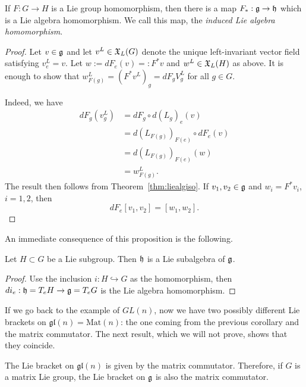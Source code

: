 \begin{proposition}
  If $F: G\to H$ is a Lie group homomorphism, then there is a map $F_*:\mathfrak{g}\to\mathfrak{h}$ which is a Lie algebra homomorphism. We call this map, the \emph{induced Lie algebra homomorphism}.
\end{proposition}
\begin{proof}
  Let $v\in\mathfrak{g}$ and let $v^L\in\mathfrak{X}_L(G)$ denote the unique left-invariant vector field satisfying $v^L_e = v$.
  Let $w := dF_e(v) =: F^*v$ and $w^L\in\mathfrak{X}_L(H)$ as above.
  It is enough to show that $w^L_{F(g)} = (F^*v^L)_g = dF_g V^L_g$ for all $g\in G$.

  Indeed, we have
  \begin{align}
    dF_g(v^L_g) &= dF_g\circ d(L_g)_e(v) \\
    &=d(L_{F(g)})_{F(e)}\circ dF_e(v) \\
    &=d(L_{F(g)})_{F(e)}(w) \\
    &=w^L_{F(g)}.
  \end{align}
  The result then follows from Theorem~\ref{thm:liealgiso}.
  If $v_1,v_2 \in\mathfrak{g}$ and $w_i=F^*v_i$, $i=1,2$, then
  \begin{equation}
    dF_e[v_1,v_2] = [w_1, w_2].
  \end{equation}
\end{proof}

An immediate consequence of this proposition is the following.
\begin{corollary}
  Let $H\subset G$ be a Lie subgroup.
  Then $\mathfrak{h}$ is a Lie subalgebra of $\mathfrak{g}$.
\end{corollary}
\begin{proof}
  Use the inclusion $i:H\hookrightarrow G$ as the homomorphism, then $di_e:\mathfrak{h} = T_eH\to \mathfrak{g} = T_eG$ is the Lie algebra homomorphism.
\end{proof}

If we go back to the example of $GL(n)$, now we have two possibly different Lie brackets on $\mathfrak{gl}(n)=\mathrm{Mat}(n)$: the one coming from the previous corollary and the matrix commutator.
The next result, which we will not prove, shows that they coincide.

\begin{proposition}
  The Lie bracket on $\mathfrak{gl}(n)$ is given by the matrix commutator.
  Therefore, if $G$ is a matrix Lie group, the Lie bracket on $\mathfrak{g}$ is also the matrix commutator.
\end{proposition}

